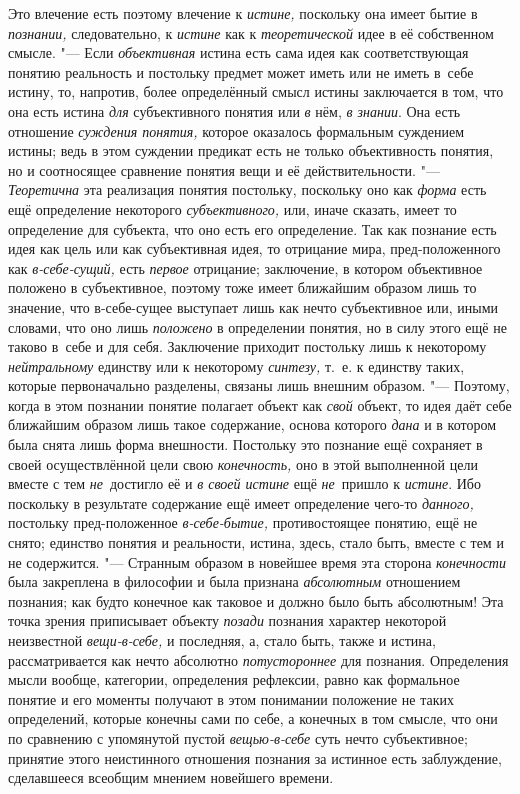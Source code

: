Это влечение есть поэтому влечение к {\em истине,} поскольку
она имеет бытие в {\em познании,} следовательно, к {\em истине} как к
{\em теоретической} идее в её собственном смысле. "--- Если
{\em объективная} истина
есть сама идея как соответствующая понятию реальность и постольку предмет
может иметь или не иметь в~себе истину, то, напротив, более определённый
смысл истины заключается в том, что она есть истина
{\em для} субъективного понятия или {\em в} нём, {\em в знании}. Она есть
отношение {\em суждения понятия,}
которое оказалось формальным суждением истины; ведь в этом
суждении предикат есть не только объективность понятия, но и соотносящее
сравнение понятия вещи и её действительности. "---
{\em Теоретична} эта реализация понятия постольку, поскольку оно как
{\em форма} есть ещё определение некоторого {\em субъективного,} или,
иначе сказать, имеет то определение для субъекта, что оно есть его
определение. Так как познание есть идея как цель или как субъективная идея,
то отрицание мира, пред-положенного как {\em в-себе-сущий,} есть
{\em первое} отрицание;
заключение, в котором объективное положено в субъективное, поэтому тоже
имеет ближайшим образом лишь то значение, что в-себе-сущее выступает лишь
как нечто субъективное или, иными словами, что оно лишь
{\em положено} в
определении понятия, но в силу этого ещё не таково в~себе и для себя.
Заключение приходит постольку лишь к некоторому
{\em нейтральному} единству или к некоторому {\em синтезу,} т.~е. к
единству таких, которые первоначально разделены, связаны лишь внешним
образом. "--- Поэтому, когда в этом познании понятие полагает
объект как {\em свой}
объект, то идея даёт себе ближайшим образом лишь такое
содержание, основа которого {\em дана}
и в котором была снята лишь форма внешности. Постольку это
познание ещё сохраняет в своей осуществлённой цели свою
{\em конечность,} оно в этой выполненной цели вместе с тем
{\em не}~достигло её и {\em в своей истине} ещё
{\em не}~пришло к {\em истине}. Ибо
поскольку в результате содержание ещё имеет определение чего-то
{\em данного,} постольку
пред-положенное {\em в-себе-бытие,}
противостоящее понятию, ещё не снято; единство понятия и
реальности, истина, здесь, стало быть, вместе с тем и не содержится. "---
Странным образом в новейшее время эта сторона {\em конечности} была
закреплена в философии и была признана {\em абсолютным} отношением
познания;
как будто конечное как таковое и должно было быть абсолютным!
Эта точка зрения приписывает объекту {\em позади} познания
характер некоторой неизвестной {\em вещи-в-себе,} и
последняя, а, стало быть, также и истина, рассматривается
как нечто абсолютно {\em потустороннее}
для познания. Определения мысли вообще, категории,
определения рефлексии, равно как формальное понятие и его моменты получают
в этом понимании положение не таких определений, которые конечны сами по
себе, а конечных в том смысле, что они по сравнению с упомянутой пустой
{\em вещью-в-себе} суть
нечто субъективное; принятие этого неистинного отношения познания за
истинное есть заблуждение, сделавшееся всеобщим мнением новейшего времени.

